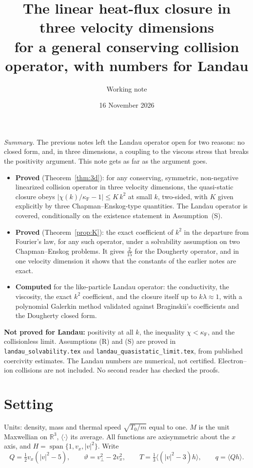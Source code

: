 \documentclass[11pt]{article}
\title{The linear heat-flux closure in three velocity dimensions\\
for a general conserving collision operator, with numbers for Landau}
\author{Working note}
\date{16 November 2026}
\newcommand{\avg}[1]{\langle #1\rangle}
\theoremstyle{remark}
\begin{document}
\sloppy
\maketitle

\noindent\emph{Summary.} The previous notes left the Landau operator open
for two reasons: no closed form, and, in three dimensions, a coupling to the
viscous stress that breaks the positivity argument. This note gets as far as
the argument goes.
\begin{itemize}
  \item \textbf{Proved} (Theorem~\ref{thm:3d}): for any conserving,
    symmetric, non-negative linearized collision operator in three velocity
    dimensions, the quasi-static closure obeys
    $|\chi(k)/\kappa_{\mathrm F}-1|\le K\,k^2$ at small $k$, two-sided, with
    $K$ given explicitly by three Chapman--Enskog-type quantities. The
    Landau operator is covered, conditionally on the existence statement in
    Assumption~(S).
  \item \textbf{Proved} (Theorem~\ref{prop:K}): the exact coefficient of
    $k^2$ in the departure from Fourier's law, for any such operator, under
    a solvability assumption on two Chapman--Enskog problems. It gives
    $\tfrac{2}{15}$ for the Dougherty operator, and in one velocity
    dimension it shows that the constants of the earlier notes are exact.
  \item \textbf{Computed} for the like-particle Landau operator: the
    conductivity, the viscosity, the exact $k^2$ coefficient, and the
    closure itself up to $k\lambda\approx1$, with a polynomial Galerkin
    method validated against Braginskii's coefficients and the Dougherty
    closed form.
\end{itemize}
\textbf{Not proved for Landau:} positivity at all $k$, the inequality
$\chi<\kappa_{\mathrm F}$, and the collisionless limit. Assumptions (R) and (S) are proved in
\texttt{landau\_solvability.tex} and
\texttt{landau\_quasistatic\_limit.tex}, from published coercivity
estimates. The Landau numbers are numerical, not certified. Electron--ion
collisions are not included. No second reader has checked the proofs.

\section{Setting}

Units: density, mass and thermal speed $\sqrt{T_0/m}$ equal to one. $M$ is
the unit Maxwellian on $\mathbb{R}^3$, $\avg{\cdot}$ its average. All
functions are axisymmetric about the $x$ axis, and
$H=\operatorname{span}\{1,v_x,|v|^2\}$. Write
\[
  Q=\tfrac12v_x(|v|^2-5),\qquad
  \vartheta=v_\perp^2-2v_x^2,\qquad
  T=\tfrac13\avg{(|v|^2-3)h},\qquad q=\avg{Qh}.
\]
\end{document}
